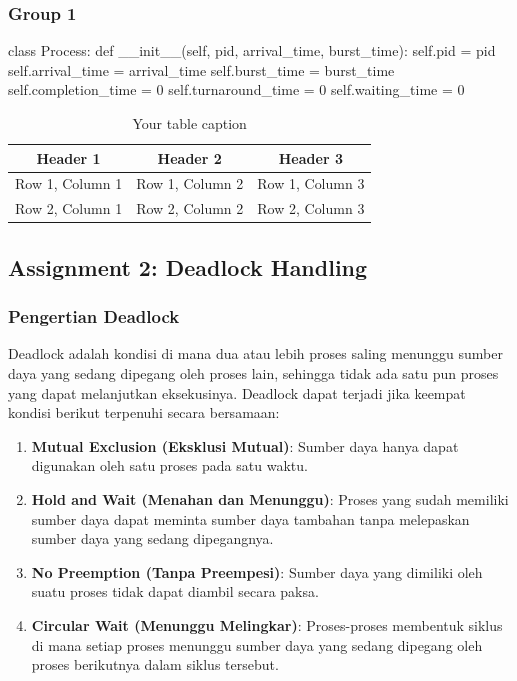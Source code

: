 \documentclass[12pt]{article}
\begin{document}
\subsubsection{Group 1}
\begin{python}
    class Process:
    def __init__(self, pid, arrival_time, burst_time):
        self.pid = pid
        self.arrival_time = arrival_time
        self.burst_time = burst_time
        self.completion_time = 0
        self.turnaround_time = 0
        self.waiting_time = 0
\end{python}

\begin{table}[htbp] %
    \centering
    \begin{tabular}{|c|c|c|} %
    \hline
    Header 1 & Header 2 & Header 3 \\ %
    \hline
    Row 1, Column 1 & Row 1, Column 2 & Row 1, Column 3 \\ %
    \hline
    Row 2, Column 1 & Row 2, Column 2 & Row 2, Column 3 \\ %
    \hline
    \end{tabular}
    \caption{Your table caption} %
    \label{tab:your_label} %
\end{table}

\subsection{Assignment 2: Deadlock Handling}
\subsubsection{Pengertian Deadlock}
Deadlock adalah kondisi di mana dua atau lebih proses saling menunggu sumber daya yang sedang dipegang oleh proses lain, sehingga tidak ada satu pun proses yang dapat melanjutkan eksekusinya. Deadlock dapat terjadi jika keempat kondisi berikut terpenuhi secara bersamaan:
\begin{enumerate}
    \item \textbf{Mutual Exclusion (Eksklusi Mutual)}: Sumber daya hanya dapat digunakan oleh satu proses pada satu waktu.
    \item \textbf{Hold and Wait (Menahan dan Menunggu)}: Proses yang sudah memiliki sumber daya dapat meminta sumber daya tambahan tanpa melepaskan sumber daya yang sedang dipegangnya.
    \item \textbf{No Preemption (Tanpa Preempesi)}: Sumber daya yang dimiliki oleh suatu proses tidak dapat diambil secara paksa.
    \item \textbf{Circular Wait (Menunggu Melingkar)}: Proses-proses membentuk siklus di mana setiap proses menunggu sumber daya yang sedang dipegang oleh proses berikutnya dalam siklus tersebut.
\end{enumerate}
\end{document}
